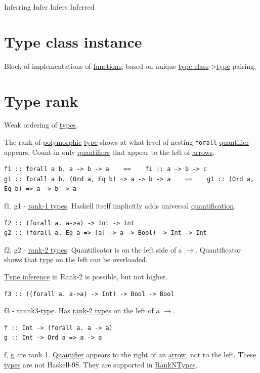 \documentclass[a4paper,14pt,oneside]{book}
\begin{document}
\label{org9afc164}Inferring
\label{org6cb6552}Infer
\label{orgc89fb8c}Infers
\label{org790298d}Inferred

\section{\label{org36c6142}Type class instance}
\label{sec:orgf877e9d}
Block of implementations of \hyperref[org934327c]{functions}, based on unique \hyperref[org8cb2c3b]{type class}->\hyperref[org1eff537]{type} pairing.

\section{\label{orgc1534be}Type rank}
\label{sec:org8a7a52d}
Weak ordering of \hyperref[orge9a3a14]{types}.

The rank of \hyperref[org5ea9f01]{polymorphic} \hyperref[org1eff537]{type} shows at what level of nesting \texttt{forall} \hyperref[org1a889de]{quantifier} appears.
Count-in only \hyperref[orgb4a24bf]{quantifiers} that appear to the left of \hyperref[orgafe2ba3]{arrows}.
\begin{verbatim}
f1 :: forall a b. a -> b -> a    ==    fi :: a -> b -> c
g1 :: forall a b. (Ord a, Eq b) => a -> b -> a    ==    g1 :: (Ord a, Eq b) => a -> b -> a
\end{verbatim}
f1, g1 - \hyperref[orgcd68993]{rank-1 types}. Haskell itself implicitly adds universal \hyperref[org61f982d]{quantification}.

\begin{verbatim}
f2 :: (forall a. a->a) -> Int -> Int
g2 :: (forall a. Eq a => [a] -> a -> Bool) -> Int -> Int
\end{verbatim}
f2, g2 - \hyperref[org5522bef]{rank-2 types}. Quantificator is on the left side of a \(\to\). Quantificator shows that \hyperref[org1eff537]{type} on the left can be overloaded.

\hyperref[org5d6dee3]{Type inference} in Rank-2 is possible, but not higher.

\begin{verbatim}
f3 :: ((forall a. a->a) -> Int) -> Bool -> Bool
\end{verbatim}
f3 - rannk3-\hyperref[org1eff537]{type}. Has \hyperref[org5522bef]{rank-2 types} on the left of a \(\to\).

\begin{verbatim}
f :: Int -> (forall a. a -> a)
g :: Int -> Ord a => a -> a
\end{verbatim}
f, g are rank 1. \hyperref[org1a889de]{Quantifier} appears to the right of an \hyperref[org74f3926]{arrow}, not to the left. These \hyperref[orge9a3a14]{types} are not Haskell-98. They are supported in \hyperref[org8a733db]{RankNTypes}.
\end{document}
